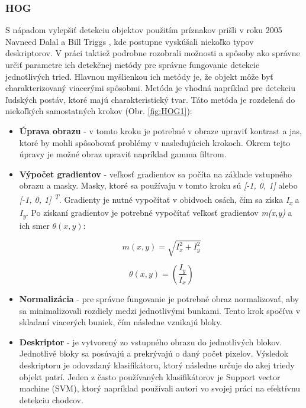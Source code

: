 \documentclass[slovak,master,dept460,male,cpp,cpdeclaration]{diploma}
\begin{document}
\subsubsection*{HOG}
\label{HOG}
S nápadom  vylepšiť detekciu objektov použitím príznakov prišli v roku 2005 Navneed Dalal a Bill Triggs \cite{dalal2005}, kde postupne vyskúšali niekoľko typov deskriptorov.  V práci taktiež podrobne rozobrali  možnosti a spôsoby ako správne určiť parametre ich detekčnej metódy pre správne fungovanie detekcie jednotlivých tried. Hlavnou myšlienkou ich metódy je, že objekt môže byť charakterizovaný  viacerými spôsobmi. Metóda je vhodná napríklad pre detekciu ľudských postáv, ktoré majú charakteristický tvar. Táto metóda je rozdelená do niekoľkých samostatných krokov (Obr. \ref{fig:HOG1}):
\begin{itemize}
  \item \textbf{Úprava obrazu} - v tomto kroku je potrebné  v obraze upraviť kontrast a jas, ktoré by mohli spôsobovať  problémy v nasledujúcich krokoch. Okrem tejto úpravy  je možné obraz upraviť napríklad gamma filtrom.
  \item \textbf{Výpočet gradientov} - veľkosť gradientov sa počíta na základe vstupného obrazu a masky. Masky, ktoré sa používaju v tomto kroku sú \textit{[-1, 0, 1]} alebo \textit{[-1, 0, 1] \textsuperscript{T}}. Gradienty je nutné vypočítať v obidvoch osách, čím sa získa \textit{I\textsubscript{x}} a \textit{I\textsubscript{y}}. Po získaní gradientov je potrebné vypočítať veľkosť gradientov \textit{m(x,y)} a ich smer \textit{$\theta(x, y)$}:
  
\begin{equation}
m(x,y)= \sqrt{I_{x}^{2} + I_{y}^{2}}
\label{eq:Výpočet veľkosti gradientu}
\end{equation}

  \begin{equation}
\theta(x, y) = \left(\frac{I_{y}}{I_{x}}\right)
\label{eq:Výpočet smeru gradientu}
\end{equation}
  \item \textbf{Normalizácia} -  pre správne fungovanie je potrebné obraz normalizovať, aby sa minimalizovali rozdiely medzi jednotlivými bunkami. Tento krok spočíva v skladaní viacerých buniek, čím následne vznikajú bloky. 
   \item \textbf{Deskriptor} -  je vytvorený zo vstupného obrazu do jednotlivých blokov. Jednotlivé bloky sa posúvajú a prekrývajú o daný počet pixelov. Výsledok deskriptoru je odovzdaný  klasifikátoru, ktorý následne určuje do akej triedy objekt patrí. Jeden z často používaných klasifikátorov je Support vector machine (SVM), ktorý napríklad používali autori vo svojej práci na efektívnu detekciu chodcov.\cite{pang2011efficient}
 \end{itemize}
\end{document}
